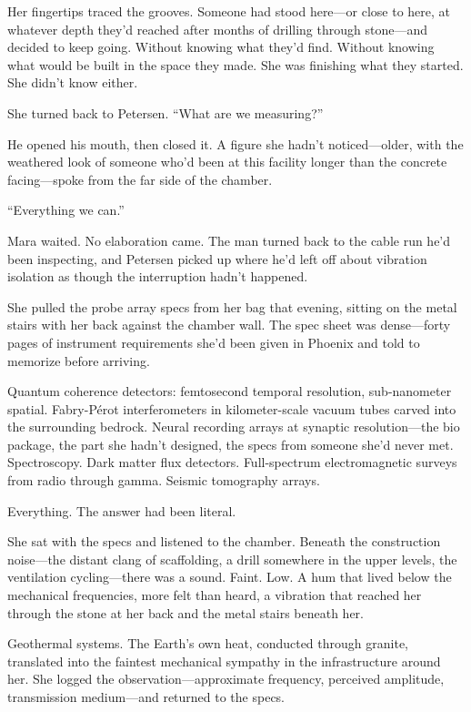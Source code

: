 Her fingertips traced the grooves. Someone had stood here---or close to here, at whatever depth they'd reached after months of drilling through stone---and decided to keep going. Without knowing what they'd find. Without knowing what would be built in the space they made. She was finishing what they started. She didn't know either.

She turned back to Petersen. ``What are we measuring?''

He opened his mouth, then closed it. A figure she hadn't noticed---older, with the weathered look of someone who'd been at this facility longer than the concrete facing---spoke from the far side of the chamber.

``Everything we can.''

Mara waited. No elaboration came. The man turned back to the cable run he'd been inspecting, and Petersen picked up where he'd left off about vibration isolation as though the interruption hadn't happened.

She pulled the probe array specs from her bag that evening, sitting on the metal stairs with her back against the chamber wall. The spec sheet was dense---forty pages of instrument requirements she'd been given in Phoenix and told to memorize before arriving.

Quantum coherence detectors: femtosecond temporal resolution, sub-nanometer spatial. Fabry-P\'{e}rot interferometers in kilometer-scale vacuum tubes carved into the surrounding bedrock. Neural recording arrays at synaptic resolution---the bio package, the part she hadn't designed, the specs from someone she'd never met. Spectroscopy. Dark matter flux detectors. Full-spectrum electromagnetic surveys from radio through gamma. Seismic tomography arrays.

Everything. The answer had been literal.

She sat with the specs and listened to the chamber. Beneath the construction noise---the distant clang of scaffolding, a drill somewhere in the upper levels, the ventilation cycling---there was a sound. Faint. Low. A hum that lived below the mechanical frequencies, more felt than heard, a vibration that reached her through the stone at her back and the metal stairs beneath her.

Geothermal systems. The Earth's own heat, conducted through granite, translated into the faintest mechanical sympathy in the infrastructure around her. She logged the observation---approximate frequency, perceived amplitude, transmission medium---and returned to the specs.

